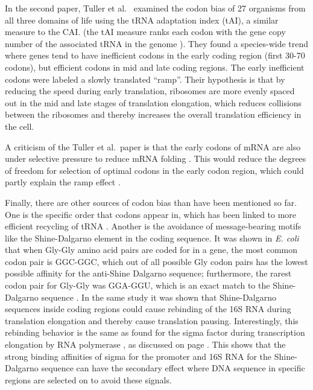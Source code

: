 In the second paper, Tuller et al.\ \cite{tuller_evolutionarily_2010} examined
the codon bias of 27 organisms from all three domains of life using the tRNA
adaptation index (tAI), a similar measure to the CAI. (the tAI measure
ranks each codon with the gene copy number of the associated tRNA in the genome
\cite{tuller_evolutionarily_2010}). They found a species-wide trend where genes
tend to have inefficient codons in the early coding region (first 30-70
codons), but efficient codons in mid and late coding regions. The early
inefficient codons were labeled a slowly translated ``ramp''. Their hypothesis
is that by reducing the speed during early translation, ribosomes are more
evenly spaced out in the mid and late stages of translation elongation, which
reduces collisions between the ribosomes and thereby increases the overall
translation efficiency in the cell.

A criticism of the Tuller et al.\ paper is that the early codons of mRNA are
also under selective pressure to reduce mRNA folding \cite{gu_universal_2010}.
This would reduce the degrees of freedom for selection of optimal codons in the
early codon region, which could partly explain the ramp effect
\cite{plotkin_synonymous_2011}.

Finally, there are other sources of codon bias than have been mentioned so far.
One is the specific order that codons appear in, which has been linked to more
efficient recycling of tRNA \cite{cannarozzi_role_2010}. Another is the
avoidance of message-bearing motifs like the Shine-Dalgarno element in the
coding sequence. It was shown in \textit{E. coli} that when Gly-Gly amino acid
pairs are coded for in a gene, the most common codon pair is GGC-GGC, which out
of all possible Gly codon pairs has the lowest possible affinity for the
anti-Shine Dalgarno sequence; furthermore, the rarest codon pair for
Gly-Gly was GGA-GGU, which is an exact match to the Shine-Dalgarno sequence
\cite{li_anti-shine-dalgarno_2012}. In the same study it was shown that
Shine-Dalgarno sequences inside coding regions could cause rebinding of the 16S
RNA during translation elongation and thereby cause translation pausing.
Interestingly, this rebinding behavior is the same as found for the sigma
factor during transcription elongation by RNA polymerase
\cite{mooney_sigma_2005}, as discussed on page \pageref{sigma_rebinding}. This
shows that the strong binding affinities of sigma for the promoter and 16S RNA
for the Shine-Dalgarno sequence can have the secondary effect where DNA
sequence in specific regions are selected on to avoid these signals.
